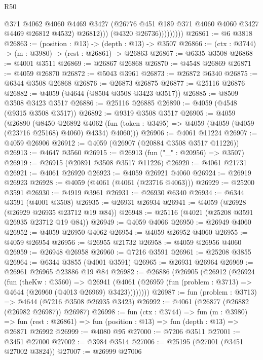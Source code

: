 \begin{lexlean}{R50}
\begin{coremodule}
                          @371
                          @4062
                          @4060
                          @4469
                          @3427
                          (@26776 @451 @189 @371 @4060 @4060 @3427 @4469 @26812 @4532)
                          @26812)))
                    (@4320 @26736)))))))))
@26861 := @6 @3818
@26863 := (position : @13) -> (depth : @13) -> @3507
@26866 := (ctx : @3744) -> (m : @3980) -> (rest : @26861) -> @26863
@26867 := @6335 @3508
@26868 := @4001 @3511
@26869 := @26867 @26868
@26870 := @4548 @26869
@26871 := @4059 @26870
@26872 := @5043 @3961
@26873 := @26872 @6340
@26875 := @6344 @3508 @26868
@26876 := @26873 @26875
@26877 := @25116 @26876
@26882 := @4059 (@4644 (@8504 @3508 @3423 @3517))
@26885 := @8509 @3508 @3423 @3517
@26886 := @25116 @26885
@26890 := @4059 (@4548 (@9315 @3508 @3517))
@26892 := @9319 @3508 @3517
@26905 := @4059
    (@26890
      (@8450
        @26892
        @4062
        (fun (token : @3495) => @4059 (@4059 (@4059 (@23716 @25168) @4060) @4334) @4060)))
@26906 := @4061 @11224
@26907 := @4059 @26906
@26912 := @4059 (@26907 (@20884 @3508 @3517 @11226))
@26913 := @4647 @3560
@26915 := @26913 (fun ("_" : @20956) => @3507)
@26919 := @26915 (@20891 @3508 @3517 @11226)
@26920 := @4061 @21731
@26921 := @4061 @26920
@26923 := @4059 @26921 @4060
@26924 := @26919 @26923
@26928 := @4059 (@4061 (@4061 (@23716 @4063)))
@26929 := @25200 @3591
@26930 := @4919 @3961
@26931 := @26930 @6340
@26934 := @6344 @3591 (@4001 @3508)
@26935 := @26931 @26934
@26941 := @4059 (@26928 (@26929 @26935 @23712 @19 @84))
@26948 := @25116 (@4021 (@25208 @3591 @26935 @23712 @19 @84))
@26949 := @4059 @4066
@26950 := @26949 @4060
@26952 := @4059 @26950 @4062
@26954 := @4059 @26952 @4060
@26955 := @4059 @26954
@26956 := @26955 @21732
@26958 := @4059 @26956 @4060
@26959 := @26948 @26958
@26960 := @7216 @3591
@26961 := @25208 @3855
@26964 := @6344 @3855 (@4001 @3591)
@26965 := @26931 @26964
@26969 := @26961 @26965 @23886 @19 @84
@26982 := @26886
    (@26905
      (@26912
        (@26924
          (fun (theKw : @3560) =>
          @26941 (@4061 (@26959 (fun (problem : @3713) => @4644 (@26960 (@4013 @26969) @3423))))))))
@26987 := fun (problem : @3713) => @4644 (@7216 @3508 @26935 @3423)
@26992 := @4061 (@26877 (@26882 (@26982 @26987)) @26987)
@26998 := fun (ctx : @3744) =>
  fun (m : @3980) =>
  fun (rest : @26861) => fun (position : @13) => fun (depth : @13) => @26871 @26992
@26999 := @4080 @95
@27000 := @7206 @3511
@27001 := @3451 @27000
@27002 := @3984 @3514
@27006 := @25195 (@27001 (@3451 @27002 @3824))
@27007 := @26999 @27006

\end{coremodule}
\end{lexlean}
